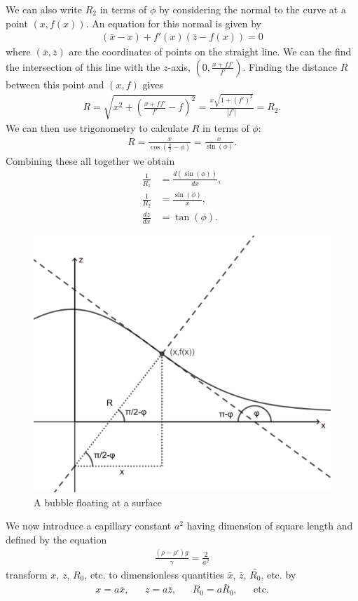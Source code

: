 We can also write $R_2$ in terms of $\phi$ by considering the normal to the curve at a point $(x,f(x))$. An equation for this normal is given by
\begin{align}
    (\bar{x}-x) + f'(x)(\bar{z}-f(x))=0
\end{align}
where $(\bar{x},\bar{z})$ are the coordinates of points on the straight line. We can the find the intersection of this line with the $z$-axis, $(0,\frac{x+ff'}{f'})$.
Finding the distance $R$ between this point and $(x,f)$ gives
\begin{align}
    R=\sqrt{x^2+(\frac{x+ff'}{f'}-f)^2}=\frac{x\sqrt{1+(f')^2}}{|f'|}=R_2.
\end{align}
We can then use trigonometry to calculate $R$ in terms of $\phi$:
\begin{align}
    R=\frac{x}{\cos(\frac{\pi}{2}-\phi)}=\frac{x}{\sin(\phi)}.
\end{align}
Combining these all together we obtain
\begin{align}
    \frac{1}{R_1}&=\frac{d(\sin(\phi))}{dx},\\
    \frac{1}{R_2}&=\frac{\sin(\phi)}{x},\\
    \frac{dz}{dx} &= \tan(\phi).
\end{align}
\begin{figure}[hb]
    \centering
    \includegraphics[width=0.6\linewidth]{WriteUp/images/angles and trig.png}
    \caption{A bubble floating at a surface}
    \label{fig:4}
\end{figure}
We now introduce a capillary constant $a^2$ having dimension of square length and defined by the equation
\begin{align}
    \frac{(\rho-\rho')g}{\gamma} = \frac{2}{a^2}
\end{align}
transform $x$, $z$, $R_0$, etc. to dimensionless quantities $\bar{x}$, $\bar{z}$, $\bar{R_0}$, etc. by
\begin{align}
    x=a\bar{x}, && z=a\bar{z}, && R_0=a\bar{R}_0, && \text{etc.}
\end{align}

